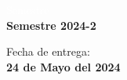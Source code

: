 \begin{titlepage}
    \vspace{17mm}
    
    \begin{minipage}{0.4\textwidth}
        \textcolor{white}{Semestre}\\
        \large\textbf{Semestre 2024-2}      
    \end{minipage}
    \begin{minipage}{0.4\textwidth}
        \begin{flushright}
            {\large Fecha de entrega:\\
             \textbf{24 de Mayo del 2024}}
        \end{flushright}
    \end{minipage}
    
    \makeatother
    
    \vfill 
    \end{titlepage}
